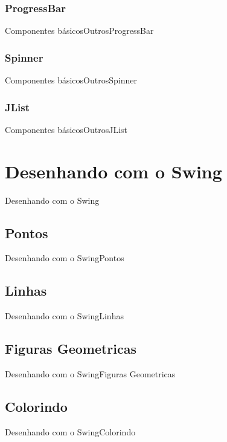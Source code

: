 \documentclass[10pt]{beamer}
\begin{document}
\subsubsection{ProgressBar}
\begin{frame}{Componentes básicos}{Outros}{ProgressBar}
\end{frame}{}
\subsubsection{Spinner}
\begin{frame}{Componentes básicos}{Outros}{Spinner}
\end{frame}{}
\subsubsection{JList}
\begin{frame}{Componentes básicos}{Outros}{JList}
\end{frame}{}
\section{Desenhando com o Swing}
\begin{frame}{Desenhando com o Swing}{}
\end{frame}{}
\subsection{Pontos}
\begin{frame}{Desenhando com o Swing}{Pontos}
\end{frame}{}
\subsection{Linhas}
\begin{frame}{Desenhando com o Swing}{Linhas}
\end{frame}{}
\subsection{Figuras Geometricas}
\begin{frame}{Desenhando com o Swing}{Figuras Geometricas}
\end{frame}{}
\subsection{Colorindo}
\begin{frame}{Desenhando com o Swing}{Colorindo}
\end{frame}{}
\end{document}
